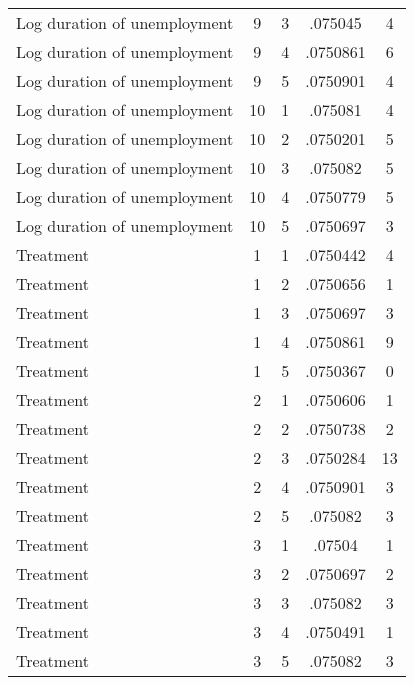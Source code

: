 \begin{tabular}{l*{4}{c}}
Log duration of unemployment&           9&           3&     .075045&           4\\
Log duration of unemployment&           9&           4&    .0750861&           6\\
Log duration of unemployment&           9&           5&    .0750901&           4\\
Log duration of unemployment&          10&           1&     .075081&           4\\
Log duration of unemployment&          10&           2&    .0750201&           5\\
Log duration of unemployment&          10&           3&     .075082&           5\\
Log duration of unemployment&          10&           4&    .0750779&           5\\
Log duration of unemployment&          10&           5&    .0750697&           3\\
Treatment           &           1&           1&    .0750442&           4\\
Treatment           &           1&           2&    .0750656&           1\\
Treatment           &           1&           3&    .0750697&           3\\
Treatment           &           1&           4&    .0750861&           9\\
Treatment           &           1&           5&    .0750367&           0\\
Treatment           &           2&           1&    .0750606&           1\\
Treatment           &           2&           2&    .0750738&           2\\
Treatment           &           2&           3&    .0750284&          13\\
Treatment           &           2&           4&    .0750901&           3\\
Treatment           &           2&           5&     .075082&           3\\
Treatment           &           3&           1&      .07504&           1\\
Treatment           &           3&           2&    .0750697&           2\\
Treatment           &           3&           3&     .075082&           3\\
Treatment           &           3&           4&    .0750491&           1\\
Treatment           &           3&           5&     .075082&           3\\

\end{tabular}

